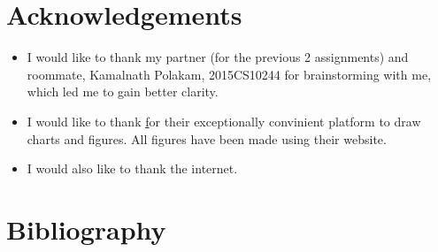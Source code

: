\documentclass[a4paper,11pt]{article}
\begin{document}
\section{Acknowledgements}
\begin{itemize}
    \item I would like to thank my partner (for the previous 2 assignments) and roommate, Kamalnath Polakam, 2015CS10244 for brainstorming with me, which led me to gain better clarity. 
    \item I would like to thank \href{draw.io} for their exceptionally convinient platform to draw charts and figures. All figures have been made using their website. 
    \item I would also like to thank the internet.
\end{itemize}

\section{Bibliography}
\end{document}
